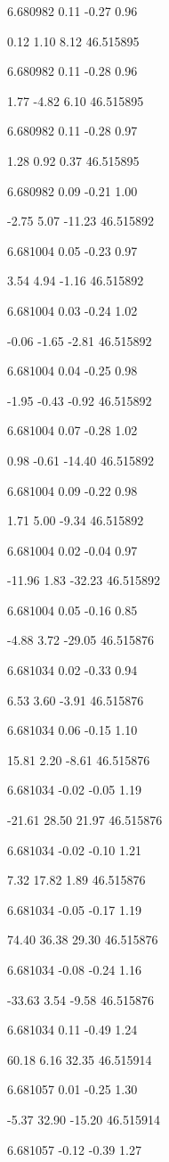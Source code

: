 6.680982
0.11
-0.27
0.96

0.12
1.10
8.12
46.515895

6.680982
0.11
-0.28
0.96

1.77
-4.82
6.10
46.515895

6.680982
0.11
-0.28
0.97

1.28
0.92
0.37
46.515895

6.680982
0.09
-0.21
1.00

-2.75
5.07
-11.23
46.515892

6.681004
0.05
-0.23
0.97

3.54
4.94
-1.16
46.515892

6.681004
0.03
-0.24
1.02

-0.06
-1.65
-2.81
46.515892

6.681004
0.04
-0.25
0.98

-1.95
-0.43
-0.92
46.515892

6.681004
0.07
-0.28
1.02

0.98
-0.61
-14.40
46.515892

6.681004
0.09
-0.22
0.98

1.71
5.00
-9.34
46.515892

6.681004
0.02
-0.04
0.97

-11.96
1.83
-32.23
46.515892

6.681004
0.05
-0.16
0.85

-4.88
3.72
-29.05
46.515876

6.681034
0.02
-0.33
0.94

6.53
3.60
-3.91
46.515876

6.681034
0.06
-0.15
1.10

15.81
2.20
-8.61
46.515876

6.681034
-0.02
-0.05
1.19

-21.61
28.50
21.97
46.515876

6.681034
-0.02
-0.10
1.21

7.32
17.82
1.89
46.515876

6.681034
-0.05
-0.17
1.19

74.40
36.38
29.30
46.515876

6.681034
-0.08
-0.24
1.16

-33.63
3.54
-9.58
46.515876

6.681034
0.11
-0.49
1.24

60.18
6.16
32.35
46.515914

6.681057
0.01
-0.25
1.30

-5.37
32.90
-15.20
46.515914

6.681057
-0.12
-0.39
1.27

